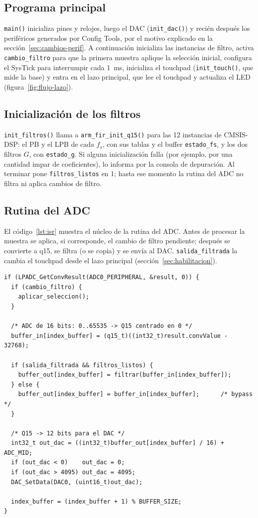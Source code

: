 \documentclass[11pt,a4paper]{article}
\begin{document}
\subsection{Programa principal}

\texttt{main()} inicializa pines y relojes, luego el DAC
(\texttt{init\_dac()}) y recién después los periféricos generados por Config
Tools, por el motivo explicado en la sección~\ref{sec:cambios-perif}. A
continuación inicializa las instancias de filtro, activa
\texttt{cambio\_filtro} para que la primera muestra aplique la selección
inicial, configura el SysTick para interrumpir cada \qty{1}{\milli\second},
inicializa el touchpad (\texttt{init\_touch()}, que mide la base) y entra en
el lazo principal, que lee el touchpad y actualiza el LED
(figura~\ref{fig:flujo-lazo}).

\subsection{Inicialización de los filtros}

\texttt{init\_filtros()} llama a \texttt{arm\_fir\_init\_q15()} para las 12
instancias de CMSIS-DSP: el PB y el LPB de cada $f_s$, con sus tablas y el
buffer \texttt{estado\_fs}, y los dos filtros $G$, con \texttt{estado\_g}.
Si alguna inicialización falla (por ejemplo, por una cantidad impar de
coeficientes), lo informa por la consola de depuración. Al terminar pone
\texttt{filtros\_listos} en 1; hasta ese momento la rutina del ADC no
filtra ni aplica cambios de filtro.

\subsection{Rutina del ADC}

El código~\ref{lst:isr} muestra el núcleo de la rutina del ADC. Antes de
procesar la muestra se aplica, si corresponde, el cambio de filtro pendiente;
después se convierte a q15, se filtra (o se copia) y se envía al DAC.
\texttt{salida\_filtrada} la cambia el
touchpad desde el lazo principal (sección~\ref{sec:habilitacion}).

\begin{lstlisting}[caption={Procesamiento de una muestra en \texttt{ADC0\_IRQHANDLER()} (\texttt{source/TP2.c}).},label={lst:isr}]
if (LPADC_GetConvResult(ADC0_PERIPHERAL, &result, 0)) {
  if (cambio_filtro) {
    aplicar_seleccion();
  }

  /* ADC de 16 bits: 0..65535 -> Q15 centrado en 0 */
  buffer_in[index_buffer] = (q15_t)((int32_t)result.convValue - 32768);

  if (salida_filtrada && filtros_listos) {
    buffer_out[index_buffer] = filtrar(buffer_in[index_buffer]);
  } else {
    buffer_out[index_buffer] = buffer_in[index_buffer];      /* bypass */
  }

  /* Q15 -> 12 bits para el DAC */
  int32_t out_dac = ((int32_t)buffer_out[index_buffer] / 16) + ADC_MID;
  if (out_dac < 0)    out_dac = 0;
  if (out_dac > 4095) out_dac = 4095;
  DAC_SetData(DAC0, (uint16_t)out_dac);

  index_buffer = (index_buffer + 1) % BUFFER_SIZE;
}
\end{lstlisting}
\end{document}
